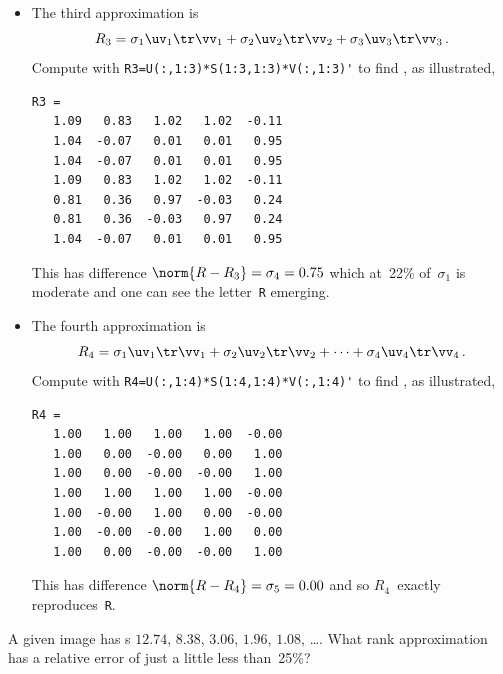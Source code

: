 \begin{example}
\begin{solution}
\begin{itemize}
\item The third approximation is 
\begin{equation*}
R_3=\sigma_1\uv_1\tr\vv_1 +\sigma_2\uv_2\tr\vv_2 +\sigma_3\uv_3\tr\vv_3\,.
\end{equation*}
Compute with \verb|R3=U(:,1:3)*S(1:3,1:3)*V(:,1:3)'| to find \twodp, as illustrated, 
\marginpar{}
\begin{verbatim}
R3 =
   1.09   0.83   1.02   1.02  -0.11
   1.04  -0.07   0.01   0.01   0.95
   1.04  -0.07   0.01   0.01   0.95
   1.09   0.83   1.02   1.02  -0.11
   0.81   0.36   0.97  -0.03   0.24
   0.81   0.36  -0.03   0.97   0.24
   1.04  -0.07   0.01   0.01   0.95
\end{verbatim}
This has difference \(\norm{R-R_3}=\sigma_4=0.75\) which at~22\% of~\(\sigma_1\) is moderate and one can see the letter~\verb|R| emerging.
 
\item The fourth approximation is 
\begin{equation*}
R_4=\sigma_1\uv_1\tr\vv_1+\sigma_2\uv_2\tr\vv_2+\cdots+\sigma_4\uv_4\tr\vv_4\,.
\end{equation*}
Compute with \verb|R4=U(:,1:4)*S(1:4,1:4)*V(:,1:4)'| to find \twodp, as illustrated, 
\marginpar{}
\begin{verbatim}
R4 =
   1.00   1.00   1.00   1.00  -0.00
   1.00   0.00  -0.00   0.00   1.00
   1.00   0.00  -0.00  -0.00   1.00
   1.00   1.00   1.00   1.00  -0.00
   1.00  -0.00   1.00   0.00  -0.00
   1.00  -0.00  -0.00   1.00   0.00
   1.00   0.00  -0.00  -0.00   1.00
\end{verbatim}
This has difference \(\norm{R-R_4}=\sigma_5=0.00\) and so \(R_4\)~exactly reproduces~\verb|R|.
 
\end{itemize}
\end{solution}
\end{example}




\begin{activity}
A given image has s \(12.74\), \(8.38\), \(3.06\), \(1.96\), \(1.08\), \ldots. 
What rank approximation has a relative error of just a little less than~25\%?
\end{activity}





